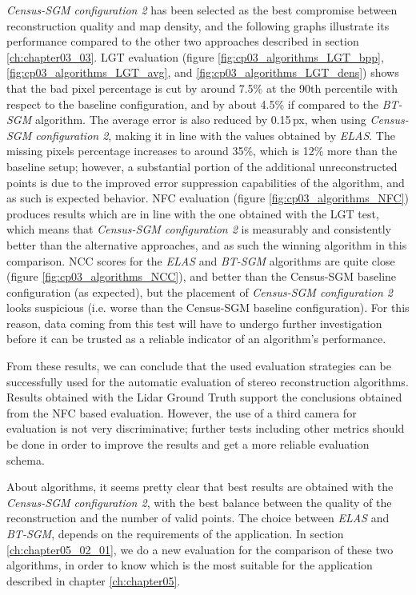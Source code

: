 \emph{Census-SGM configuration 2} has been selected as the best compromise between reconstruction quality and map density, and the following graphs illustrate its performance compared to the other two approaches described in section \ref{ch:chapter03_03}. LGT evaluation (figure \ref{fig:cp03_algorithms_LGT_bpp}, \ref{fig:cp03_algorithms_LGT_avg}, and \ref{fig:cp03_algorithms_LGT_dens}) shows that the bad pixel percentage is cut by around 7.5\% at the 90th percentile with respect to the baseline configuration, and by about 4.5\% if compared to the \emph{BT-SGM} algorithm. The average error is also reduced by 0.15\,px, when using \emph{Census-SGM configuration 2}, making it in line with the values obtained by \emph{ELAS}. The missing pixels percentage increases to around 35\%, which is 12\% more than the baseline setup; however, a substantial portion of the additional unreconstructed points is due to the improved error suppression capabilities of the algorithm, and as such is expected behavior.
NFC evaluation (figure \ref{fig:cp03_algorithms_NFC}) produces results which are in line with the one obtained with the LGT test, which means that \emph{Census-SGM configuration 2} is measurably and consistently better than the alternative approaches, and as such the winning algorithm in this comparison.
NCC scores for the \emph{ELAS} and \emph{BT-SGM} algorithms are quite close (figure \ref{fig:cp03_algorithms_NCC}), and better than the Census-SGM baseline configuration (as expected), but the placement of \emph{Census-SGM configuration 2} looks suspicious (i.e. worse than the Census-SGM baseline configuration). For this reason, data coming from this test will have to undergo further investigation before it can be trusted as a reliable indicator of an algorithm's performance.

From these results, we can conclude that the used evaluation strategies can be successfully used for the automatic evaluation of stereo reconstruction algorithms. Results obtained with the Lidar Ground Truth support the conclusions obtained from the NFC based evaluation. However, the use of a third camera for evaluation is not very discriminative; further tests including other metrics should be done in order to improve the results and get a more reliable evaluation schema.

About algorithms, it seems pretty clear that best results are obtained with the \emph{Census-SGM configuration 2}, with the best balance between the quality of the reconstruction and the number of valid points. The choice between \emph{ELAS} and \emph{BT-SGM}, depends on the requirements of the application. In section \ref{ch:chapter05_02_01}, we do a new evaluation for the comparison of these two algorithms, in order to know which is the most suitable for the application described in chapter \ref{ch:chapter05}.

